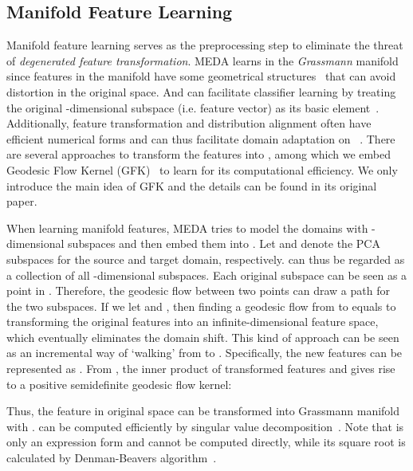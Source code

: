 \documentclass[sigconf]{acmart}
\begin{document}
\subsection{Manifold Feature Learning}

Manifold feature learning serves as the preprocessing step to eliminate the threat of \textit{degenerated feature transformation}. MEDA learns  in the \textit{Grassmann} manifold ~\cite{hamm2008grassmann} since features in the manifold have some geometrical structures~\cite{belkin2006manifold,hamm2008grassmann} that can avoid distortion in the original space. And  can facilitate classifier learning by treating the original -dimensional subspace (i.e. feature vector) as its basic element~\cite{baktashmotlagh2014domain}. Additionally, feature transformation and distribution alignment often have efficient numerical forms and can thus facilitate domain adaptation on ~\cite{hamm2008grassmann}. There are several approaches to transform the features into  \cite{gopalan2011domain,baktashmotlagh2014domain}, among which we embed Geodesic Flow Kernel (GFK)~\cite{gong2012geodesic} to learn  for its computational efficiency. We only introduce the main idea of GFK and the details can be found in its original paper.

When learning manifold features, MEDA tries to model the domains with -dimensional subspaces and then embed them into . Let  and  denote the PCA subspaces for the source and target domain, respectively.  can thus be regarded as a collection of all -dimensional subspaces. Each original subspace can be seen as a point in . Therefore, the geodesic flow  between two points can draw a path for the two subspaces. If we let  and , then finding a geodesic flow from  to  equals to transforming the original features into an infinite-dimensional feature space, which eventually eliminates the domain shift. This kind of approach can be seen as an incremental way of `walking' from  to . Specifically, the new features can be represented as . From \cite{gong2012geodesic}, the inner product of transformed features  and  gives rise to a positive semidefinite geodesic flow kernel:


Thus, the feature in original space can be transformed into Grassmann manifold with .  can be computed efficiently by singular value decomposition~\cite{gong2012geodesic}. Note that  is only an expression form and cannot be computed directly, while its square root is calculated by Denman-Beavers algorithm~\cite{denman1976matrix}.

\label{sec-da}
\end{document}
